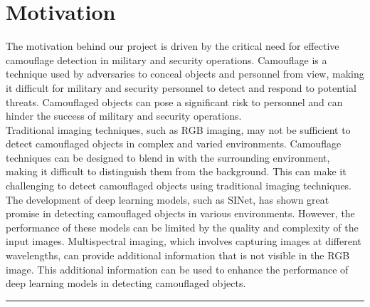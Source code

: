 \section{{{\fontsize{17}{21}\selectfont \textbf{Motivation}}}}
\setlength{\columnsep}{1.5cm}

\begin{multicols}{2}

The motivation behind our project is driven by the critical need for effective camouflage detection in military and security operations. Camouflage is a technique used by adversaries to conceal objects and personnel from view, making it difficult for military and security personnel to detect and respond to potential threats. Camouflaged objects can pose a significant risk to personnel and can hinder the success of military and security operations.\\
Traditional imaging techniques, such as RGB imaging, may not be sufficient to detect camouflaged objects in complex and varied environments. Camouflage techniques can be designed to blend in with the surrounding environment, making it difficult to distinguish them from the background. This can make it challenging to detect camouflaged objects using traditional imaging techniques.\\
The development of deep learning models, such as SINet, has shown great promise in detecting camouflaged objects in various environments. However, the performance of these models can be limited by the quality and complexity of the input images. Multispectral imaging, which involves capturing images at different wavelengths, can provide additional information that is not visible in the RGB image. This additional information can be used to enhance the performance of deep learning models in detecting camouflaged objects.\\
\end{multicols}

\vspace{0.5cm}
{\color{gray}\hrule}
\vspace{0.5cm}